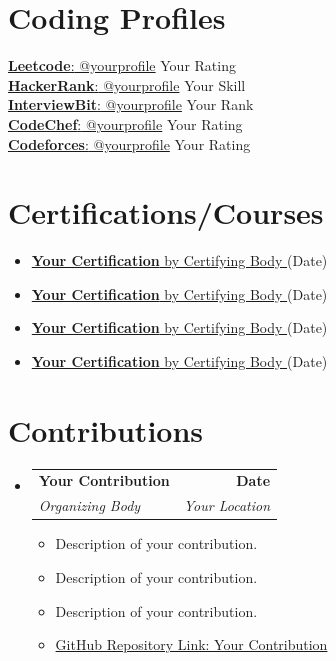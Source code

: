 \documentclass[a4paper,11pt]{article}
\makeatletter
\newcommand{\resumeItem}[1]{
  \item\small{
    {#1 \vspace{-2pt}}
  }
}
\newcommand{\resumeSubheading}[4]{
  \vspace{-2pt}\item
    \begin{tabular*}{0.97\textwidth}[t]{l@{\extracolsep{\fill}}r}
      \textbf{#1} & \textbf{\small #2} \\
      \textit{\small#3} & \textit{\small #4} \\
    \end{tabular*}\vspace{-7pt}
}
\newcommand{\resumeSubHeadingListStart}{\begin{itemize}[leftmargin=0.15in, label={}]}
\newcommand{\resumeSubHeadingListEnd}{\end{itemize}}
\newcommand{\resumeItemListStart}{\begin{itemize}}
\newcommand{\resumeItemListEnd}{\end{itemize}\vspace{-5pt}}
\makeatother
\begin{document}
\section{Coding Profiles}
\begin{multicols}{2}
  \begin{itemize}[leftmargin=0.15in, label={}]
    \small{\item{
      \href{https://leetcode.com/yourprofile/}{\underline{\textbf{Leetcode}}{:} @yourprofile} Your Rating \\
      \href{https://www.hackerrank.com/yourprofile}{\underline{\textbf{HackerRank}}{:} @yourprofile} Your Skill \\
      \href{https://www.interviewbit.com/profile/yourprofile/}{\underline{\textbf{InterviewBit}}{:} @yourprofile} Your Rank \\
      \href{https://www.codechef.com/users/yourprofile}{\underline{\textbf{CodeChef}}{:} @yourprofile} Your Rating \\
      \href{https://codeforces.com/profile/yourprofile}{\underline{\textbf{Codeforces}}{:} @yourprofile} Your Rating \\
      }
    }
  \end{itemize}
\end{multicols}

\vspace{-3pt}
  \section{Certifications/Courses}
    \resumeItemListStart[parsep = 0pt]
      \resumeItem{\href{https://yourcertification.com}{\textbf{Your Certification} by Certifying Body \faExternalLink*} (Date)}
      \resumeItem{\href{https://yourcertification.com}{\textbf{Your Certification} by Certifying Body \faExternalLink*} (Date)}
      \resumeItem{\href{https://yourcertification.com}{\textbf{Your Certification} by Certifying Body \faExternalLink*} (Date)}
      \resumeItem{\href{https://yourcertification.com}{\textbf{Your Certification} by Certifying Body \faExternalLink*} (Date)}
    \resumeItemListEnd

\section{Contributions}
  \resumeSubHeadingListStart
    \resumeSubheading
      {Your Contribution}{Date}
      {Organizing Body}{Your Location}
      \resumeItemListStart
        \resumeItem{Description of your contribution.}
        \resumeItem{Description of your contribution.}
        \resumeItem{Description of your contribution.}
          \resumeItem{\href{https://github.com/yourprofile/yourcontribution}{GitHub Repository Link: Your Contribution}}
              \resumeItemListEnd
          \resumeSubHeadingListEnd
\end{document}
